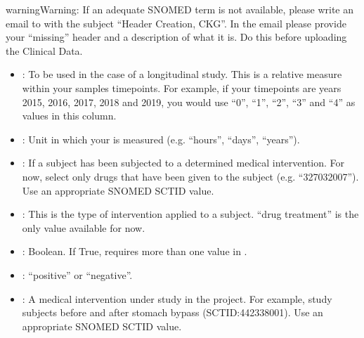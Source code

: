 \documentclass[letterpaper,10pt,english]{sphinxmanual}
\begin{document}
\begin{sphinxadmonition}{warning}{Warning:}
If an adequate SNOMED term is not available, please write an e\sphinxhyphen{}mail to  with the subject “Header Creation, CKG”. In the email please provide your “missing” header and a description of what it is. Do this before uploading the Clinical Data.
\end{sphinxadmonition}

\begin{itemize}
\item {} 
: To be used in the case of a longitudinal study. This is a relative measure within your samples timepoints. For example, if your timepoints are years 2015, 2016, 2017, 2018 and 2019, you would use “0”, “1”, “2”, “3” and “4” as values in this column.

\item {} 
: Unit in which your  is measured (e.g. “hours”, “days”, “years”).

\item {} 
: If a subject has been subjected to a determined medical intervention. For now, select only drugs that have been given to the subject (e.g. “327032007”). Use an appropriate SNOMED SCTID value.

\item {} 
: This is the type of intervention applied to a subject. “drug treatment” is the only value available for now.

\item {} 
: Boolean. If True, requires more than one value in .

\item {} 
: “positive” or “negative”.

\item {} 
: A medical intervention under study in the project. For example, study subjects before and after stomach bypass (SCTID:442338001). Use an appropriate SNOMED SCTID value.

\end{itemize}
\end{document}
